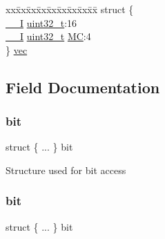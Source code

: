 \begin{DoxyCompactItemize}
\begin{tabbing}
\end{tabbing}\item 
\begin{tabbing}
xx\=xx\=xx\=xx\=xx\=xx\=xx\=xx\=xx\=\kill
struct \{\\
\>\mbox{\hyperlink{core__cm0plus_8h_af63697ed9952cc71e1225efe205f6cd3}{\_\_I}} \mbox{\hyperlink{union_t_c_c___i_n_t_f_l_a_g___type_a7c2ec0f7b3f1314bdede58b182af397c}{uint32\_t}}:16\\
\>\mbox{\hyperlink{core__cm0plus_8h_af63697ed9952cc71e1225efe205f6cd3}{\_\_I}} \mbox{\hyperlink{union_t_c_c___i_n_t_f_l_a_g___type_a7c2ec0f7b3f1314bdede58b182af397c}{uint32\_t}} \mbox{\hyperlink{union_t_c_c___i_n_t_f_l_a_g___type_a72bed5ad77fbf569b9e9bdab85239f62}{MC}}:4\\
\} \mbox{\hyperlink{union_t_c_c___i_n_t_f_l_a_g___type_ace4f5b012f51a434f288481d81645394}{vec}}\\

\end{tabbing}\end{DoxyCompactItemize}


\subsection{Field Documentation}
\mbox{\label{union_t_c_c___i_n_t_f_l_a_g___type_a2dc6854aaa26812b513e7d17b6bb844f}} 
\subsubsection{\texorpdfstring{bit}{bit}\hspace{0.1cm}{\footnotesize\ttfamily [1/2]}}
{\footnotesize\ttfamily struct \{ ... \}   bit}

Structure used for bit access \mbox{\label{union_t_c_c___i_n_t_f_l_a_g___type_a3d0f11f0fddcf63b4a98cdd7fe2565e3}} 
\subsubsection{\texorpdfstring{bit}{bit}\hspace{0.1cm}{\footnotesize\ttfamily [2/2]}}
{\footnotesize\ttfamily struct \{ ... \}   bit}

